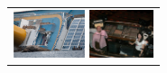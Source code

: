 \documentclass{acm_proc_article-sp}
\newcommand{\thumbheight}{14mm}
\newenvironment{thumbsequence}{}{\makebox[4mm]{}}
\begin{document}
\begin{figure}
\begin{tabular}{p{\textwidth}}
\begin{thumbsequence}
		\includegraphics[height=\thumbheight]{resources/concordia/looseduplicate4.jpg}
	\end{thumbsequence}
	\begin{thumbsequence}
		\includegraphics[height=\thumbheight]{resources/concordia/looseduplicate5.jpg}

\end{thumbsequence}
\end{tabular}
\end{figure}
\end{document}
